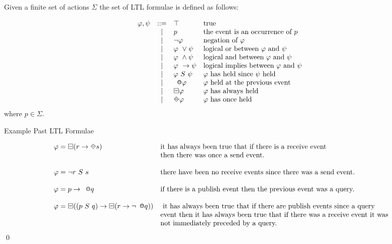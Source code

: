 \begin{definition}Given a finite set of actions $ \Sigma $ the set of LTL formulae is defined as follows:

$$ \begin{array}{lcll}
\varphi, \psi & ::= & \top & \mbox{true}\
\\
& | & p & \mbox{the event is an occurrence of}\ p\ 
\\ 
&| & \neg\varphi & \mbox{negation of}\ \varphi\ 
\\
&| & \varphi\ \lor \psi & \mbox{logical or between}\ \varphi\ \mbox{and}\ \psi\
\\
&| & \varphi\ \land \psi & \mbox{logical and between}\ \varphi\ \mbox{and}\ \psi\
\\
& | & \varphi\ \rightarrow \psi & \mbox{logical implies between}\ \varphi\ \mbox{and}\ \psi\
\\
& | & \varphi\ S\ \psi & \varphi\ \mbox{has held since}\ \psi\ \mbox{held}\
\\
& | & \LTLprevious\varphi & \varphi\ \mbox{held at the previous event}\ 
\\
& | & \LTLalwaysbeen\varphi & \varphi\ \mbox{has always held}\ 
\\
& | & \LTLonce\varphi & \varphi\ \mbox{has once}\ \mbox{held}\ 
\end{array}$$
where $ p \in \Sigma $.
\end{definition}

\newpage

\begin{myEx} Example Past LTL Formulae

$$\begin{array}{ll}
\varphi = \LTLalwaysbeen(r \rightarrow \LTLonce s)& \mbox{it has always been true that if there is a receive event}\\
& \mbox{then there was once a send event.}
\\
\\
\varphi = \neg r\ S\ s& \mbox{there have been no receive events since there was a send event.}
\\
\\
\varphi = p \rightarrow \LTLprevious q& \mbox{if there is a publish event then the previous event was a query.}
\\
\\
\varphi = \LTLalwaysbeen((p \ S\ q) \rightarrow \LTLalwaysbeen(r \rightarrow \neg\LTLprevious q))& \mbox{ it has always been true that if there are publish events since a query}\\ & \mbox{event then it has always been true that if there was a receive event it was}\\ & \mbox{not immediately preceded by a query.}
\end{array}$$
\qed
\end{myEx}

